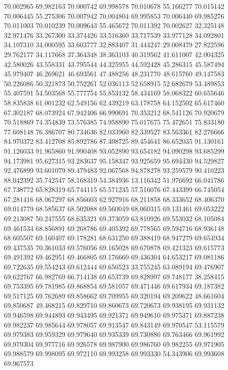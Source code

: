 70.002965
69.982163
70.000742
69.998578
70.010678
55.166277
70.015142
70.006445
55.275306
70.007942
70.004804
69.995853
70.006440
69.985276
70.011003
70.010239
70.009643
55.465672
70.011392
70.002627
32.325148
32.971476
33.267300
33.374426
33.516360
33.717539
33.977128
34.092801
34.107310
34.000595
33.603777
32.883407
31.444247
29.008479
27.822596
29.762177
34.117668
37.364348
38.363103
40.319562
41.611007
42.004325
42.580026
43.558331
43.795544
44.325955
44.592428
45.286315
45.587494
45.979407
46.269621
46.693561
47.488256
48.231770
48.615760
49.147583
50.226086
50.321873
50.752261
52.036113
52.658915
52.682679
53.489853
55.407591
54.503568
55.777754
55.853132
58.434169
58.068322
60.655646
58.835838
61.001232
62.549156
62.439219
63.178758
64.152502
65.617460
67.302187
68.073924
67.942406
66.990691
70.353212
68.541126
70.920679
70.518869
74.354839
73.576385
74.958890
75.017675
75.472651
75.833180
77.608148
76.386707
80.734636
82.033960
82.339527
83.563361
82.276666
84.970372
83.412708
85.892786
87.408725
89.454641
86.652035
91.130161
91.126033
91.965860
91.990408
93.052890
93.654182
94.090298
93.685299
94.173981
95.627315
93.283637
95.158347
93.925659
95.694430
94.529827
92.476899
93.601079
89.479483
92.067568
94.878278
93.259579
90.410223
88.042392
35.742547
58.168319
54.384936
13.116342
51.976692
66.041786
67.738772
65.828319
65.744115
65.571235
57.516076
67.443399
66.745054
67.281416
68.067297
68.856603
62.927916
68.211858
68.333652
68.406370
69.014779
68.585637
68.502088
69.560049
68.060315
69.131461
69.053222
69.213087
50.247555
68.635321
69.373059
63.810926
69.553032
68.105084
69.461534
68.856891
69.268786
69.405392
69.778565
69.594716
68.936148
68.605507
69.160407
69.178281
68.631250
69.388419
68.947279
69.654934
69.437535
70.361033
69.576056
69.165028
69.670878
69.421323
69.615773
69.491392
69.462951
69.466805
69.176660
69.436304
64.653217
69.081186
69.722635
69.554243
69.612444
69.650523
33.755245
63.089194
69.476907
69.622767
66.982769
66.714138
69.653739
69.828997
69.748177
38.258415
69.753395
69.781985
69.868854
69.581057
69.471446
69.617934
69.187382
69.517125
69.762689
69.858662
69.709955
69.320194
69.209622
48.661604
69.850687
49.468215
69.829710
69.860673
69.720673
69.938195
69.931132
69.946598
69.944893
69.943495
69.921371
69.949610
69.975371
69.887238
69.982237
69.985644
69.978057
69.913547
69.843149
69.970547
53.115579
69.979383
69.959329
69.979640
69.935339
69.730880
69.763466
69.961992
69.979304
69.977716
69.926578
69.987900
69.986760
69.982255
69.971905
69.988579
69.998095
69.972110
69.993258
69.993330
54.343906
69.993608
69.967573
